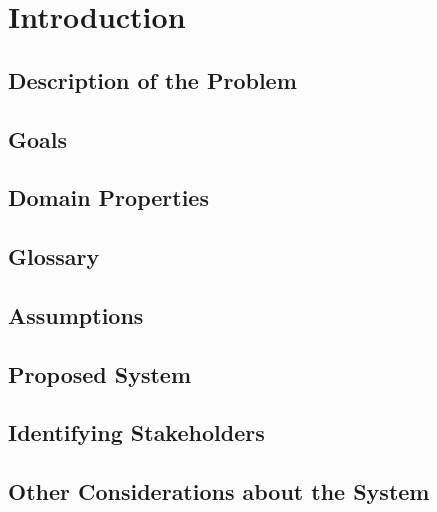 \chapter{Introduction}

\section{Description of the Problem}

\section{Goals}

\section{Domain Properties}

\section{Glossary}

\section{Assumptions}

\section{Proposed System}

\section{Identifying Stakeholders}

\section{Other Considerations about the System}